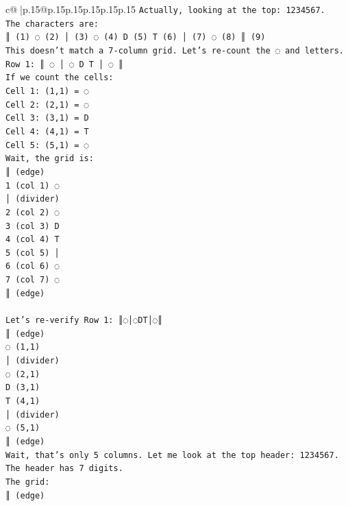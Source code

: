 \documentclass{article}
\begin{document}
{\begin{supertabular}{c@{$\;$}|p{.15\linewidth}@{}p{.15\linewidth}p{.15\linewidth}p{.15\linewidth}p{.15\linewidth}p{.15\linewidth}}
{{{\texttt{Actually, looking at the top: 1234567.} \\
\texttt{The characters are:} \\
\texttt{║ (1) ◌ (2) │ (3) ◌ (4) D (5) T (6) │ (7) ◌ (8) ║ (9)} \\
\texttt{This doesn't match a 7{-}column grid. Let's re{-}count the ◌ and letters.} \\
\texttt{Row 1: ║ ◌ │ ◌ D T │ ◌ ║} \\
\texttt{If we count the cells:} \\
\texttt{Cell 1: (1,1) = ◌} \\
\texttt{Cell 2: (2,1) = ◌} \\
\texttt{Cell 3: (3,1) = D} \\
\texttt{Cell 4: (4,1) = T} \\
\texttt{Cell 5: (5,1) = ◌} \\
\texttt{Wait, the grid is:} \\
\texttt{║ (edge)} \\
\texttt{1 (col 1) ◌} \\
\texttt{│ (divider)} \\
\texttt{2 (col 2) ◌} \\
\texttt{3 (col 3) D} \\
\texttt{4 (col 4) T} \\
\texttt{5 (col 5) │} \\
\texttt{6 (col 6) ◌} \\
\texttt{7 (col 7) ◌} \\
\texttt{║ (edge)} \\
\\ 
\texttt{Let's re{-}verify Row 1: ║◌│◌DT│◌║} \\
\texttt{║ (edge)} \\
\texttt{◌ (1,1)} \\
\texttt{│ (divider)} \\
\texttt{◌ (2,1)} \\
\texttt{D (3,1)} \\
\texttt{T (4,1)} \\
\texttt{│ (divider)} \\
\texttt{◌ (5,1)} \\
\texttt{║ (edge)} \\
\texttt{Wait, that's only 5 columns. Let me look at the top header: 1234567.} \\
\texttt{The header has 7 digits.} \\
\texttt{The grid:} \\
\texttt{║ (edge)} \\
}}}
\end{supertabular}}
\end{document}
